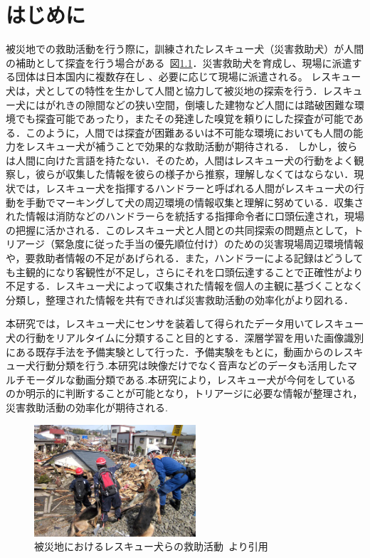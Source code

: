 \chapter{はじめに}
被災地での救助活動を行う際に，訓練されたレスキュー犬（災害救助犬）が人間の補助として探査を行う場合がある~図\ref{resque}．災害救助犬を育成し、現場に派遣する団体は日本国内に複数存在し
、必要に応じて現場に派遣される。
レスキュー犬は，犬としての特性を生かして人間と協力して被災地の探索を行う．レスキュー犬にはがれきの隙間などの狭い空間，倒壊した建物など人間には踏破困難な環境でも探査可能であったり，またその発達した嗅覚を頼りにした探査が可能である．このように，人間では探査が困難あるいは不可能な環境においても人間の能力をレスキュー犬が補うことで効果的な救助活動が期待される．
しかし，彼らは人間に向けた言語を持たない．そのため，人間はレスキュー犬の行動をよく観察し，彼らが収集した情報を彼らの様子から推察，理解しなくてはならない．現状では，レスキュー犬を指揮するハンドラーと呼ばれる人間がレスキュー犬の行動を手動でマーキングして犬の周辺環境の情報収集と理解に努めている．収集された情報は消防などのハンドラーらを統括する指揮命令者に口頭伝達され，現場の把握に活かされる．このレスキュー犬と人間との共同探索の問題点として，トリアージ（緊急度に従った手当の優先順位付け）のための災害現場周辺環境情報や，要救助者情報の不足があげられる．また，ハンドラーによる記録はどうしても主観的になり客観性が不足し，さらにそれを口頭伝達することで正確性がより不足する．レスキュー犬によって収集された情報を個人の主観に基づくことなく分類し，整理された情報を共有できれば災害救助活動の効率化がより図れる．

本研究では，レスキュー犬にセンサを装着して得られたデータ用いてレスキュー犬の行動をリアルタイムに分類すること目的とする．深層学習を用いた画像識別にある既存手法を予備実験として行った．予備実験をもとに，動画からのレスキュー犬行動分類を行う.本研究は映像だけでなく音声などのデータも活用したマルチモーダルな動画分類である.本研究により，レスキュー犬が今何をしているのか明示的に判断することが可能となり，トリアージに必要な情報が整理され，災害救助活動の効率化が期待される.
\begin{figure}[htbp]
 \begin{center}
  \includegraphics[width=6cm]{./Figures/resque.eps}
  \caption{被災地におけるレスキュー犬らの救助活動~\cite{buycott}より引用}
  \label{resque}
 \end{center}
\end{figure}

